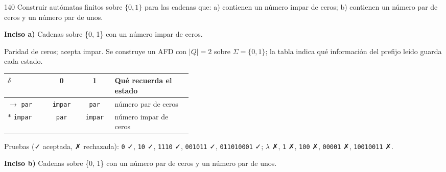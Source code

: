 \documentclass[11pt]{article}
\begin{document}
\begin{ejercicio}{140}{}
Construir autómatas finitos sobre $\{0, 1\}$ para las cadenas que: a) contienen un número impar de ceros; b) contienen un número par de ceros y un número par de unos.
\end{ejercicio}
\proc 

\textbf{Inciso a)} Cadenas sobre \{0, 1\} con un número impar de ceros.

Paridad de ceros; acepta impar. Se construye un AFD con $|Q| = 2$ sobre $\Sigma = \{0, 1\}$; la tabla indica qué información del prefijo leído guarda cada estado.
\begin{center}\small\begin{tabular}{lccp{0.42\linewidth}}\toprule
$\delta$ & 0 & 1 & Qué recuerda el estado \\\midrule
$\to$ \texttt{par} & \texttt{impar} & \texttt{par} & número par de ceros \\
$*$ \texttt{impar} & \texttt{par} & \texttt{impar} & número impar de ceros \\
\bottomrule\end{tabular}\end{center}
Pruebas (✓ aceptada, ✗ rechazada): \texttt{0} ✓, \texttt{10} ✓, \texttt{1110} ✓, \texttt{001011} ✓, \texttt{011010001} ✓; $\lambda$ ✗, \texttt{1} ✗, \texttt{100} ✗, \texttt{00001} ✗, \texttt{10010011} ✗.


\textbf{Inciso b)} Cadenas sobre \{0, 1\} con un número par de ceros y un número par de unos.
\end{document}
